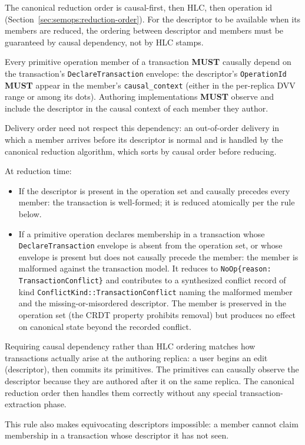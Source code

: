 \documentclass[11pt,letterpaper]{report}
\newcounter{requirement}[chapter]
\newcommand{\MUST}{\textbf{MUST}}
\begin{document}
The canonical reduction order is causal-first, then HLC, then
operation id (Section~\ref{sec:semops:reduction-order}). For the
descriptor to be available when its members are reduced, the
ordering between descriptor and members must be guaranteed by
causal dependency, not by HLC stamps.

\begin{requirement}
  \label{req:semops:transaction-descriptor-causality}
  Every primitive operation member of a transaction \MUST{} causally
  depend on the transaction's \texttt{DeclareTransaction} envelope:
  the descriptor's \texttt{OperationId} \MUST{} appear in the
  member's \texttt{causal\_context} (either in the per-replica DVV
  range or among its dots). Authoring implementations \MUST{}
  observe and include the descriptor in the causal context of each
  member they author.

  Delivery order need not respect this dependency: an out-of-order
  delivery in which a member arrives before its descriptor is
  normal and is handled by the canonical reduction algorithm,
  which sorts by causal order before reducing.

  At reduction time:

  \begin{itemize}
    \item If the descriptor is present in the operation set and
      causally precedes every member: the transaction is
      well-formed; it is reduced atomically per the rule below.
    \item If a primitive operation declares membership in a
      transaction whose \texttt{DeclareTransaction} envelope is
      absent from the operation set, or whose envelope is present
      but does not causally precede the member: the member is
      malformed against the transaction model. It reduces to
      \texttt{NoOp\{reason: TransactionConflict\}} and contributes
      to a synthesized conflict record of kind
      \texttt{ConflictKind::TransactionConflict} naming the
      malformed member and the missing-or-misordered descriptor.
      The member is preserved in the operation set (the CRDT
      property prohibits removal) but produces no effect on
      canonical state beyond the recorded conflict.
  \end{itemize}
\end{requirement}

\begin{rationale}
  Requiring causal dependency rather than HLC ordering matches
  how transactions actually arise at the authoring replica: a
  user begins an edit (descriptor), then commits its primitives.
  The primitives can causally observe the descriptor because they
  are authored after it on the same replica. The canonical
  reduction order then handles them correctly without any special
  transaction-extraction phase.

  This rule also makes equivocating descriptors impossible:
  a member cannot claim membership in a transaction whose
  descriptor it has not seen.
\end{rationale}
\end{document}
